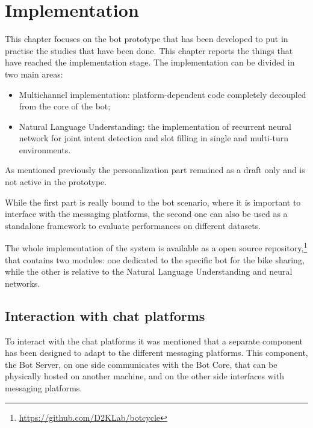 


\chapter{Implementation}
\label{implementation}

This chapter focuses on the bot prototype that has been developed to put in practise the studies that have been done. This chapter reports the things that have reached the implementation stage. The implementation can be divided in two main areas:

\begin{itemize}
	\item Multichannel implementation: platform-dependent code completely decoupled from the core of the bot;

	\item Natural Language Understanding: the implementation of recurrent neural network for joint intent detection and slot filling in single and multi-turn environments.
\end{itemize}

As mentioned previously the personalization part remained as a draft only and is not active in the prototype.

While the first part is really bound to the bot scenario, where it is important to interface with the messaging platforms, the second one can also be used as a standalone framework to evaluate performances on different datasets.

The whole implementation of the system is available as a open source repository,\footnote{\url{https://github.com/D2KLab/botcycle}} that contains two modules: one dedicated to the specific bot for the bike sharing, while the other is relative to the Natural Language Understanding and neural networks.

\section{Interaction with chat platforms}
\label{implementationInteraction}

To interact with the chat platforms it was mentioned that a separate component has been designed to adapt to the different messaging platforms. This component, the Bot Server, on one side communicates with the Bot Core, that can be physically hosted on another machine, and on the other side interfaces with messaging platforms.

